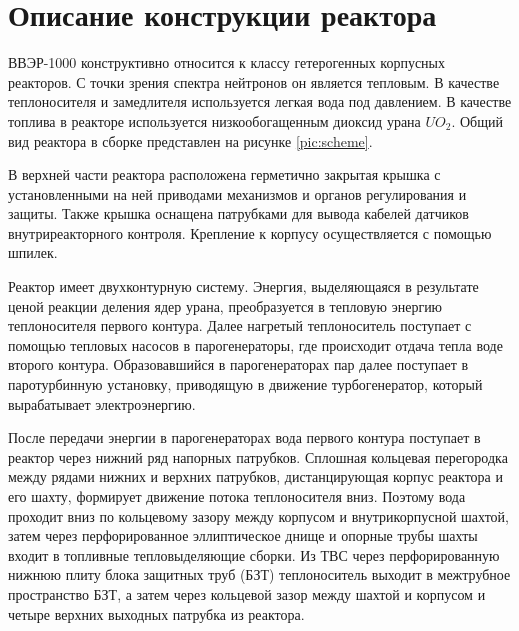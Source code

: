 


\section{Описание конструкции реактора}
ВВЭР-1000 конструктивно относится к классу гетерогенных корпусных реакторов. С точки зрения спектра нейтронов он является тепловым. В качестве теплоносителя и замедлителя используется легкая вода под давлением. В качестве топлива в реакторе используется низкообогащенным диоксид урана $UO_2$. Общий вид реактора в сборке представлен на рисунке \ref{pic:scheme}. 


В верхней части реактора расположена герметично закрытая крышка с установленными на ней приводами механизмов и органов регулирования и защиты. Также крышка оснащена патрубками для вывода кабелей датчиков внутриреакторного контроля. Крепление  к корпусу осуществляется с помощью шпилек. 


Реактор имеет двухконтурную систему. Энергия, выделяющаяся в результате ценой реакции деления ядер урана, преобразуется в тепловую энергию теплоносителя первого контура. Далее нагретый теплоноситель поступает с помощью тепловых насосов в парогенераторы, где происходит отдача тепла воде второго контура. Образовавшийся в парогенераторах пар далее поступает в паротурбинную установку, приводящую в движение турбогенератор, который вырабатывает электроэнергию.

После передачи энергии в парогенераторах вода первого контура поступает в реактор через нижний ряд напорных патрубков. Сплошная кольцевая перегородка между рядами нижних и верхних патрубков, дистанцирующая корпус реактора и его шахту, формирует движение потока теплоносителя вниз. Поэтому вода проходит вниз по кольцевому зазору между корпусом и внутрикорпусной шахтой, затем через перфорированное эллиптическое днище и опорные трубы шахты входит в топливные тепловыделяющие сборки. Из ТВС через перфорированную нижнюю плиту блока защитных труб (БЗТ) теплоноситель выходит в межтрубное пространство БЗТ, а затем через кольцевой зазор между шахтой и корпусом и четыре верхних выходных патрубка из реактора.

